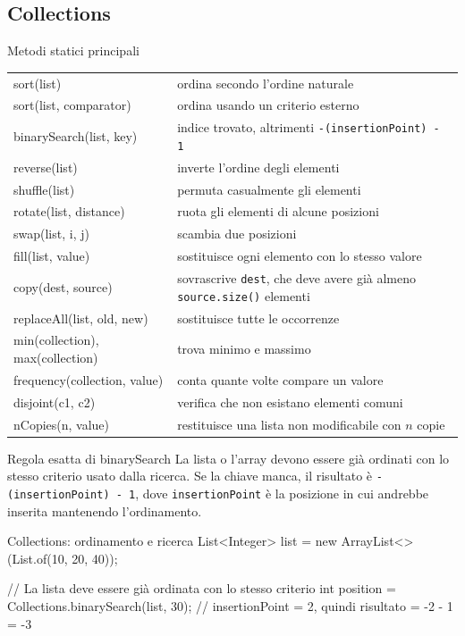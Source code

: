 ﻿\documentclass[10pt,a4paper]{article}
\newcommand{\cmd}[1]{\texttt{#1}}
\newcommand{\topicsubsection}[1]{\Needspace{10\baselineskip}\subsection{#1}}
\newenvironment{topicblock}{%
  \par\medskip\noindent\begin{minipage}{\textwidth}%
}{%
  \end{minipage}\par\medskip%
}
\begin{document}
\begin{topicblock}
\topicsubsection{Collections}
\begin{concept}{Metodi statici principali}
\renewcommand{\arraystretch}{1.15}
\begin{tabularx}{\textwidth}{>{\ttfamily\small}p{5.5cm} X}
sort(list) & ordina secondo l'ordine naturale \\
sort(list, comparator) & ordina usando un criterio esterno \\
binarySearch(list, key) & indice trovato, altrimenti \cmd{-(insertionPoint) - 1} \\
reverse(list) & inverte l'ordine degli elementi \\
shuffle(list) & permuta casualmente gli elementi \\
rotate(list, distance) & ruota gli elementi di alcune posizioni \\
swap(list, i, j) & scambia due posizioni \\
fill(list, value) & sostituisce ogni elemento con lo stesso valore \\
copy(dest, source) & sovrascrive \cmd{dest}, che deve avere già almeno \cmd{source.size()} elementi \\
replaceAll(list, old, new) & sostituisce tutte le occorrenze \\
min(collection), max(collection) & trova minimo e massimo \\
frequency(collection, value) & conta quante volte compare un valore \\
disjoint(c1, c2) & verifica che non esistano elementi comuni \\
nCopies(n, value) & restituisce una lista non modificabile con $n$ copie \\
\end{tabularx}
\end{concept}

\begin{examtrap}{Regola esatta di binarySearch}
La lista o l'array devono essere già ordinati con lo stesso criterio usato
dalla ricerca. Se la chiave manca, il risultato è
\cmd{-(insertionPoint) - 1}, dove \cmd{insertionPoint} è la posizione in cui
andrebbe inserita mantenendo l'ordinamento.
\end{examtrap}

\begin{codebox}{Collections: ordinamento e ricerca}
List<Integer> list = new ArrayList<>(List.of(10, 20, 40));

// La lista deve essere già ordinata con lo stesso criterio
int position = Collections.binarySearch(list, 30);
// insertionPoint = 2, quindi risultato = -2 - 1 = -3


\end{codebox}
\end{topicblock}
\end{document}
